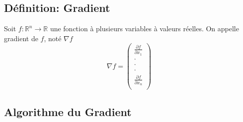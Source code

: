 \documentclass{article}
\begin{document}
	\subsection{Définition: Gradient}
		Soit $f: \mathbb{R}^{n} \to \mathbb{R}$ une fonction à plusieurs variables à valeurs réelles. On appelle gradient de $f$, noté $\nabla f$
		\[ \nabla f= \begin{pmatrix} 
					\frac{\partial f}{\partial x_1} \\
						\cdot \\
						\cdot \\
						\cdot \\
						\frac{\partial f}{\partial x_n}\\
				 \end{pmatrix} \] 

	\subsection{Algorithme du Gradient}
\end{document}
